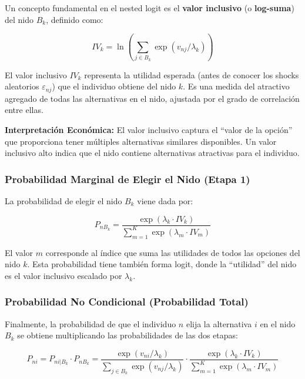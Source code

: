 \documentclass[
]{book}
\begin{document}
Un concepto fundamental en el nested logit es el \textbf{valor inclusivo} (o \textbf{log-suma}) del nido \(B_k\), definido como:

\begin{equation}
IV_k = \ln\left(\sum_{j \in B_k} \exp(v_{nj}/\lambda_k)\right)
\label{eq:inclusivevalue}
\end{equation}

El valor inclusivo \(IV_k\) representa la utilidad esperada (antes de conocer los shocks aleatorios \(\varepsilon_{nj}\)) que el individuo obtiene del nido \(k\). Es una medida del atractivo agregado de todas las alternativas en el nido, ajustada por el grado de correlación entre ellas.

\textbf{Interpretación Económica:} El valor inclusivo captura el ``valor de la opción'' que proporciona tener múltiples alternativas similares disponibles. Un valor inclusivo alto indica que el nido contiene alternativas atractivas para el individuo.

\subsubsection{Probabilidad Marginal de Elegir el Nido (Etapa 1)}\label{probabilidad-marginal-de-elegir-el-nido-etapa-1}

La probabilidad de elegir el nido \(B_k\) viene dada por:

\begin{equation}
P_{nB_k} = \frac{\exp(\lambda_k \cdot IV_k)}{\sum_{m=1}^K \exp(\lambda_m \cdot IV_m)}
\label{eq:nestprob}
\end{equation}

El valor \(m\) corresponde al índice que suma las utilidades de todos las opciones del nido \(k\). Esta probabilidad tiene también forma logit, donde la ``utilidad'' del nido es el valor inclusivo escalado por \(\lambda_k\).

\subsubsection{Probabilidad No Condicional (Probabilidad Total)}\label{probabilidad-no-condicional-probabilidad-total}

Finalmente, la probabilidad de que el individuo \(n\) elija la alternativa \(i\) en el nido \(B_k\) se obtiene multiplicando las probabilidades de las dos etapas:

\begin{equation}
P_{ni} = P_{ni|B_k} \cdot P_{nB_k} = \frac{\exp(v_{ni}/\lambda_k)}{\sum_{j \in B_k} \exp(v_{nj}/\lambda_k)} \cdot \frac{\exp(\lambda_k \cdot IV_k)}{\sum_{m=1}^K \exp(\lambda_m \cdot IV_m)}
\label{eq:totalprob}
\end{equation}
\end{document}
